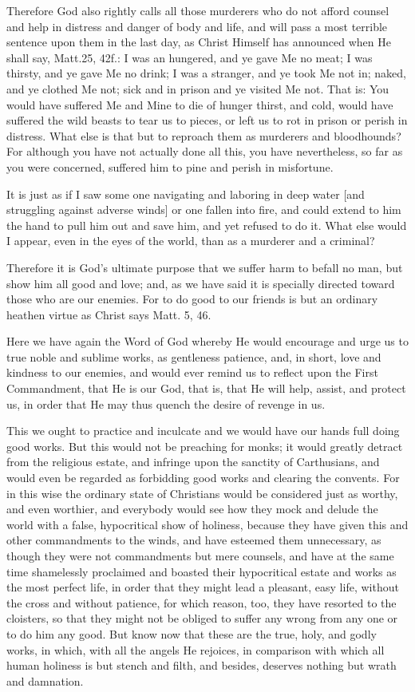 Therefore God also rightly calls all those murderers who do not afford
counsel and help in distress and danger of body and life, and will pass
a most terrible sentence upon them in the last day, as Christ Himself
has announced when He shall say, Matt.25, 42f.: I was an hungered, and
ye gave Me no meat; I was thirsty, and ye gave Me no drink; I was a
stranger, and ye took Me not in; naked, and ye clothed Me not; sick and
in prison and ye visited Me not. That is: You would have suffered Me
and Mine to die of hunger thirst, and cold, would have suffered the
wild beasts to tear us to pieces, or left us to rot in prison or perish
in distress. What else is that but to reproach them as murderers and
bloodhounds? For although you have not actually done all this, you have
nevertheless, so far as you were concerned, suffered him to pine and
perish in misfortune.

It is just as if I saw some one navigating and laboring in deep water
[and struggling against adverse winds] or one fallen into fire, and
could extend to him the hand to pull him out and save him, and yet
refused to do it. What else would I appear, even in the eyes of the
world, than as a murderer and a criminal?

Therefore it is God's ultimate purpose that we suffer harm to befall no
man, but show him all good and love; and, as we have said it is
specially directed toward those who are our enemies. For to do good to
our friends is but an ordinary heathen virtue as Christ says Matt. 5,
46.

Here we have again the Word of God whereby He would encourage and urge
us to true noble and sublime works, as gentleness patience, and, in
short, love and kindness to our enemies, and would ever remind us to
reflect upon the First Commandment, that He is our God, that is, that
He will help, assist, and protect us, in order that He may thus quench
the desire of revenge in us.

This we ought to practice and inculcate and we would have our hands
full doing good works. But this would not be preaching for monks; it
would greatly detract from the religious estate, and infringe upon the
sanctity of Carthusians, and would even be regarded as forbidding good
works and clearing the convents. For in this wise the ordinary state of
Christians would be considered just as worthy, and even worthier, and
everybody would see how they mock and delude the world with a false,
hypocritical show of holiness, because they have given this and other
commandments to the winds, and have esteemed them unnecessary, as
though they were not commandments but mere counsels, and have at the
same time shamelessly proclaimed and boasted their hypocritical estate
and works as the most perfect life, in order that they might lead a
pleasant, easy life, without the cross and without patience, for which
reason, too, they have resorted to the cloisters, so that they might
not be obliged to suffer any wrong from any one or to do him any good.
But know now that these are the true, holy, and godly works, in which,
with all the angels He rejoices, in comparison with which all human
holiness is but stench and filth, and besides, deserves nothing but
wrath and damnation.

